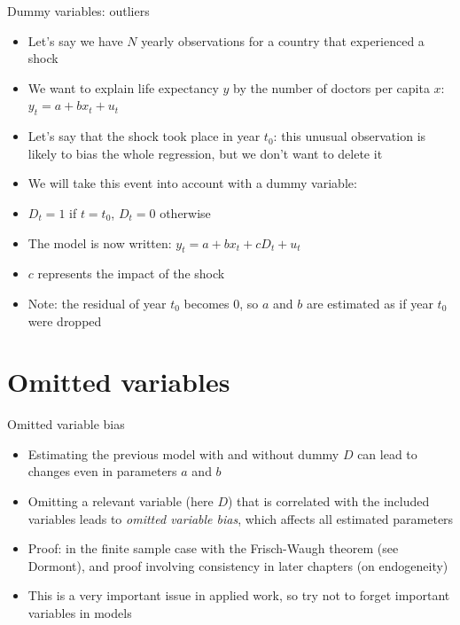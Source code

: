 \documentclass[aspectratio=169]{beamer}
\begin{document}
\begin{frame}{Dummy variables: outliers}
\begin{itemize}
    \item Let's say we have $N$ yearly observations for a country that experienced a shock
    \item We want to explain life expectancy $y$ by the number of doctors per capita $x$: $y_t = a + b x_t + u_t$
    \item Let's say that the shock took place in year $t_0$: this unusual observation is likely to bias the whole regression, but we don't want to delete it
    \item We will take this event into account with a dummy variable:
    \item $D_t = 1$ if $t = t_0$, $D_t = 0$ otherwise
    \item The model is now written: $y_t = a + b x_t + c D_t + u_t$
    \item $c$ represents the impact of the shock
    \item Note: the residual of year $t_0$ becomes 0, so $a$ and $b$ are estimated as if year $t_0$ were dropped
\end{itemize}
\end{frame}

\section{Omitted variables}

\begin{frame}{Omitted variable bias}
\begin{itemize}
    \item Estimating the previous model with and without dummy $D$ can lead to changes even in parameters $a$ and $b$
    \item Omitting a relevant variable (here $D$) that is correlated with the included variables leads to \textit{omitted variable bias}, which affects all estimated parameters
    \item Proof: in the finite sample case with the Frisch-Waugh theorem (see Dormont), and proof involving consistency in later chapters (on endogeneity)
    \item This is a very important issue in applied work, so try not to forget important variables in models
\end{itemize}
\end{frame}
\end{document}
